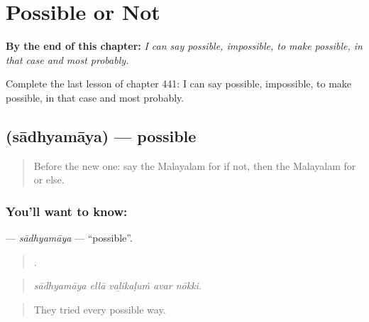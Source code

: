 
\chapter{Possible or Not}
\label{ch:ml-possible-or-not}

\begin{chapteropening}
\textbf{By the end of this chapter:} \emph{I can say possible, impossible, to make possible, in that case and most probably.}

Complete the last lesson of chapter 441: I can say possible, impossible, to make possible, in that case and most probably.
\end{chapteropening}

\section[\texorpdfstring{\ml{സാധ്യമായ} (sādhyamāya)}{സാധ്യമായ (sādhyamāya)}]{ (sādhyamāya) — possible}

\label{lesson:ML-C441-sadhyamaya}



\begin{quote}
Before the new one: say the Malayalam for if not, then the Malayalam for or else.
\end{quote}

\subsection*{You'll want to know: }
\textbf{} — \emph{sādhyamāya} — \textquotedblleft{}possible\textquotedblright{}.

\begin{quote}
    .
\end{quote}

\begin{quote}
\emph{sādhyamāya ellā vaḻikaḷuṁ avar nōkki.}
\end{quote}

\begin{quote}
They tried every possible way.
\end{quote}

